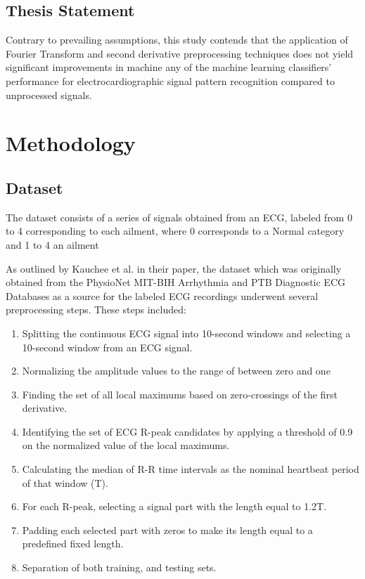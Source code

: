\documentclass[runningheads]{llncs}
\begin{document}
\subsection{Thesis Statement}
Contrary to prevailing assumptions, this study contends that the application of Fourier Transform and second derivative preprocessing techniques does not yield significant improvements in machine any of the machine learning classifiers' performance for electrocardiographic signal pattern recognition compared to unprocessed signals.
    
\section{Methodology}

\subsection{Dataset}

The dataset consists of a series of signals obtained from an ECG, labeled from 0 to 4 corresponding to each ailment, where 0 corresponds to a Normal category and 1 to 4 an ailment

As outlined by Kauchee et al. \cite{kachuee2018ecg} in their paper, the dataset which was originally obtained from the PhysioNet MIT-BIH Arrhythmia and PTB Diagnostic ECG Databases as a source for the labeled ECG recordings underwent several preprocessing steps. These steps included:

\begin{enumerate}
    \item Splitting the continuous ECG signal into 10-second windows and selecting a 10-second window from an ECG signal.
    \item Normalizing the amplitude values to the range of between zero and one
    \item Finding the set of all local maximums based on zero-crossings of the first derivative.
    \item Identifying the set of ECG R-peak candidates by applying a threshold of 0.9 on the normalized value of the local maximums.
    \item Calculating the median of R-R time intervals as the nominal heartbeat period of that window (T).
    \item For each R-peak, selecting a signal part with the length equal to 1.2T.
    \item Padding each selected part with zeros to make its length equal to a predefined fixed length.
    \item Separation of both training, and testing sets.
\end{enumerate}
\end{document}
